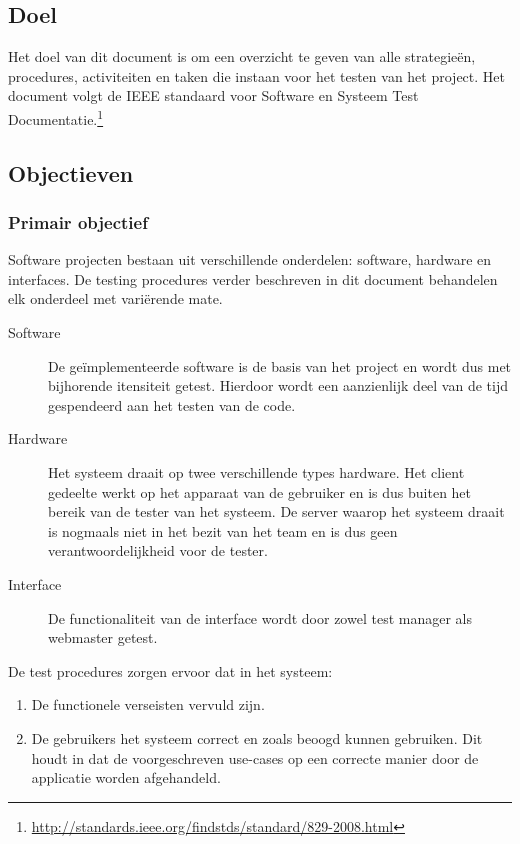 \documentclass[a4paper]{article}
\begin{document}
\subsection{Doel}
Het doel van dit document is om een overzicht te geven van alle strategieën, procedures, activiteiten en taken die instaan voor het testen van het project. Het document volgt de IEEE standaard voor Software en Systeem Test Documentatie.\footnote{\url{http://standards.ieee.org/findstds/standard/829-2008.html}} 

\subsection{Objectieven}

\subsubsection{Primair objectief}

Software projecten bestaan uit verschillende onderdelen: software, hardware en interfaces. De testing procedures verder beschreven in dit document behandelen elk onderdeel met variërende mate.

\begin{description}
\item[Software] De geïmplementeerde software is de basis van het project en wordt dus met bijhorende itensiteit getest. Hierdoor wordt een aanzienlijk deel van de tijd gespendeerd aan het testen van de code.

\item[Hardware] Het systeem draait op twee verschillende types hardware. Het client gedeelte werkt op het apparaat van de gebruiker en is dus buiten het bereik van de tester van het systeem. De server waarop het systeem draait is nogmaals niet in het bezit van het team en is dus geen verantwoordelijkheid voor de tester.

\item[Interface] De functionaliteit van de interface wordt door zowel test manager als webmaster getest.

\end{description}

De test procedures zorgen ervoor dat in het systeem:

\begin{enumerate}
\item De functionele verseisten vervuld zijn.
\item De gebruikers het systeem correct en zoals beoogd kunnen gebruiken. 
	  Dit houdt in dat de voorgeschreven use-cases op een correcte manier door de applicatie worden afgehandeld.

\end{enumerate}
\end{document}
